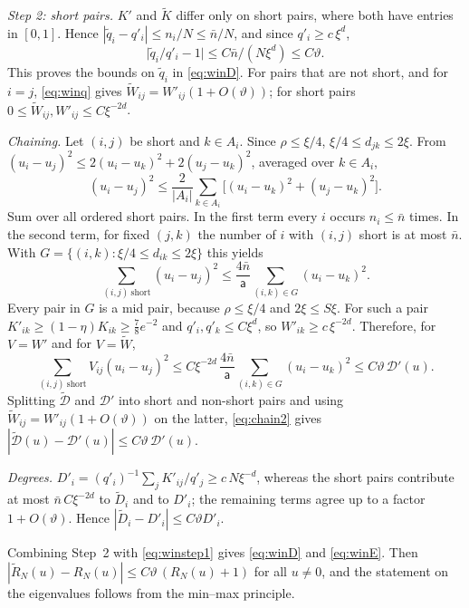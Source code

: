 \documentclass[11pt,a4paper]{article}
\makeatletter
\theoremstyle{stmt}
\theoremstyle{defn}
\theoremstyle{rmk}
\renewenvironment{proof}[1][\proofname]{\par\pushQED{\qed}\normalfont\topsep6\p@\@plus6\p@\relax
  \trivlist\item[\hskip\labelsep{\sffamily\itshape\small #1.}]\ignorespaces}{\popQED\endtrivlist\@endpefalse}
\numberwithin{equation}{section}
\makeatother
\begin{document}
\begin{proof}[Proof of Proposition~\ref{prop:window}]
\emph{Step 2: short pairs.} $K'$ and $\tilde K$ differ only on short pairs, where both have entries in $[0,1]$. Hence $|\tilde q_i-q'_i|\le n_i/N\le\bar n/N$, and since $q'_i\ge c\,\xi^d$,
\begin{equation}\label{eq:winq}
\big|\tilde q_i/q'_i-1\big|\le C\bar n/(N\xi^d)\le C\vartheta .
\end{equation}
This proves the bounds on $\tilde q_i$ in \eqref{eq:winD}. For pairs that are not short, and for $i=j$, \eqref{eq:winq} gives $\tilde W_{ij}=W'_{ij}(1+O(\vartheta))$; for short pairs $0\le\tilde W_{ij},W'_{ij}\le C\xi^{-2d}$.

\emph{Chaining.} Let $(i,j)$ be short and $k\in A_i$. Since $\rho\le\xi/4$, $\xi/4\le d_{jk}\le2\xi$. From $(u_i-u_j)^2\le2(u_i-u_k)^2+2(u_j-u_k)^2$, averaged over $k\in A_i$,
\[
(u_i-u_j)^2\le\frac{2}{|A_i|}\sum_{k\in A_i}\big[(u_i-u_k)^2+(u_j-u_k)^2\big].
\]
Sum over all ordered short pairs. In the first term every $i$ occurs $n_i\le\bar n$ times. In the second term, for fixed $(j,k)$ the number of $i$ with $(i,j)$ short is at most $\bar n$. With $G=\{(i,k):\xi/4\le d_{ik}\le2\xi\}$ this yields
\begin{equation}\label{eq:shortchain}
\sum_{(i,j)\ \mathrm{short}}(u_i-u_j)^2\le\frac{4\bar n}{\mathsf a}\sum_{(i,k)\in G}(u_i-u_k)^2 .
\end{equation}
Every pair in $G$ is a mid pair, because $\rho\le\xi/4$ and $2\xi\le S\xi$. For such a pair $K'_{ik}\ge(1-\eta)K_{ik}\ge\tfrac78e^{-2}$ and $q'_i,q'_k\le C\xi^d$, so $W'_{ik}\ge c\,\xi^{-2d}$. Therefore, for $V=W'$ and for $V=\tilde W$,
\begin{equation}\label{eq:chain2}
\sum_{(i,j)\ \mathrm{short}}V_{ij}(u_i-u_j)^2\le C\xi^{-2d}\,\frac{4\bar n}{\mathsf a}\sum_{(i,k)\in G}(u_i-u_k)^2\le C\vartheta\,\mathcal D'(u).
\end{equation}
Splitting $\tilde{\mathcal D}$ and $\mathcal D'$ into short and non-short pairs and using $\tilde W_{ij}=W'_{ij}(1+O(\vartheta))$ on the latter, \eqref{eq:chain2} gives $|\tilde{\mathcal D}(u)-\mathcal D'(u)|\le C\vartheta\,\mathcal D'(u)$.

\emph{Degrees.} $D'_i=(q'_i)^{-1}\sum_jK'_{ij}/q'_j\ge c\,N\xi^{-d}$, whereas the short pairs contribute at most $\bar n\,C\xi^{-2d}$ to $\tilde D_i$ and to $D'_i$; the remaining terms agree up to a factor $1+O(\vartheta)$. Hence $|\tilde D_i-D'_i|\le C\vartheta D'_i$.

Combining Step~2 with \eqref{eq:winstep1} gives \eqref{eq:winD} and \eqref{eq:winE}. Then $|\tilde R_N(u)-R_N(u)|\le C\vartheta\,(R_N(u)+1)$ for all $u\ne0$, and the statement on the eigenvalues follows from the min--max principle.
\end{proof}
\end{document}
